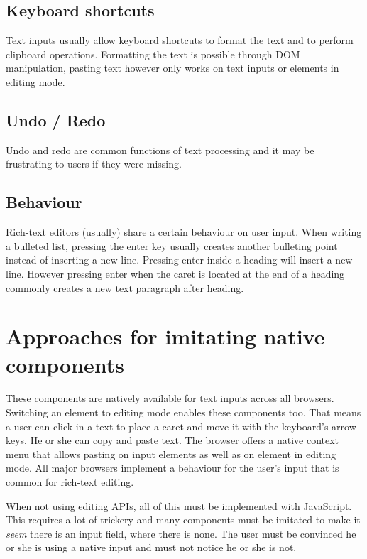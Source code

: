 \subsection{Keyboard shortcuts} Text inputs usually allow keyboard shortcuts to format the text and to perform clipboard operations. Formatting the text is possible through DOM manipulation, pasting text however only works on text inputs or elements in editing mode. %

\subsection{Undo / Redo} Undo and redo are common functions of text processing and it may be frustrating to users if they were missing.

\subsection{Behaviour} Rich-text editors (usually) share a certain behaviour on user input. When writing a bulleted list, pressing the enter key usually creates another bulleting point instead of inserting a new line. Pressing enter inside a heading will insert a new line. However pressing enter when the caret is located at the end of a heading commonly creates a new text paragraph after heading. %

\section{Approaches for imitating native components} 
\label{sec:approaches_for_imitating_native_components}

These components are natively available for text inputs across all browsers. Switching an element to editing mode enables these components too. That means a user can click in a text to place a caret and move it with the keyboard's arrow keys. He or she can copy and paste text. The browser offers a native context menu that allows pasting on input elements as well as on element in editing mode. All major browsers implement a behaviour for the user's input that is common for rich-text editing.

When not using editing APIs, all of this must be implemented with JavaScript. This requires a lot of trickery and many components must be imitated to make it \textit{seem} there is an input field, where there is none. The user must be convinced he or she is using a native input and must not notice he or she is not.

